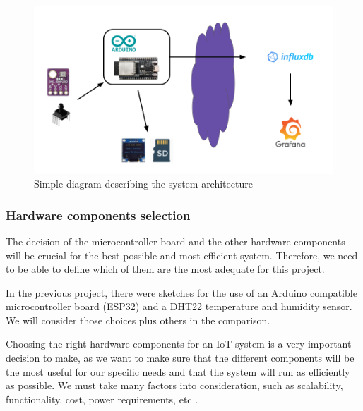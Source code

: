 \documentclass[12pt]{article}
\begin{document}
\begin{figure}[h]
\label{fig:system-arch}
\includegraphics[scale=0.45]{system-arch}
\centering
\caption{Simple diagram describing the system architecture}
\end{figure}

\subsubsection{Hardware components selection}

The decision of the microcontroller board and the other hardware components will be crucial for the best possible and most efficient system. Therefore, we need to be able to define which of them are the most adequate for this project.\par

In the previous project, there were sketches for the use of an Arduino compatible microcontroller board (ESP32) and a DHT22 temperature and humidity sensor. We will consider those choices plus others in the comparison.\par

Choosing the right hardware components for an IoT system is a very important decision to make, as we want to make sure that the different components will be the most useful for our specific needs and that the system will run as efficiently as possible. We must take many factors into consideration, such as scalability, functionality, cost, power requirements, etc \cite{digiteum}.\par
\end{document}
